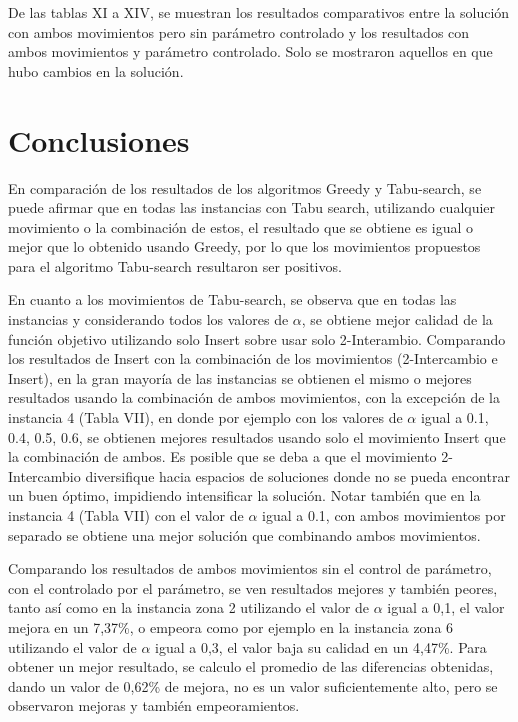 \documentclass[conference]{IEEEtran}
\begin{document}
De las tablas XI a XIV, se muestran los resultados comparativos entre la soluci\'on con ambos movimientos pero sin par\'ametro controlado y los resultados con ambos movimientos y par\'ametro controlado. Solo se mostraron aquellos en que hubo cambios en la soluci\'on.


\section{Conclusiones}

En comparaci\'on de los resultados de los algoritmos Greedy y Tabu-search, se puede afirmar que en todas las instancias con Tabu search, utilizando cualquier movimiento o la combinaci\'on de estos, el resultado que se obtiene es igual o mejor que lo obtenido usando Greedy, por lo que los movimientos propuestos para el algoritmo Tabu-search resultaron ser positivos.

En cuanto a los movimientos de Tabu-search, se observa que en todas las instancias y considerando todos los valores de $\alpha$, se obtiene mejor calidad de la funci\'on objetivo utilizando solo Insert sobre usar solo 2-Interambio. Comparando los resultados de Insert con la combinaci\'on de los movimientos (2-Intercambio e Insert), en la gran mayor\'ia de las instancias se obtienen el mismo o mejores resultados usando la combinaci\'on de ambos movimientos, con la excepci\'on de la instancia 4 (Tabla VII), en donde por ejemplo con los valores de $\alpha$ igual a 0.1, 0.4, 0.5, 0.6, se obtienen mejores resultados usando solo el movimiento Insert que la combinaci\'on de ambos. Es posible que se deba a que el movimiento 2-Intercambio diversifique hacia espacios de soluciones donde no se pueda encontrar un buen \'optimo, impidiendo intensificar la soluci\'on. Notar tambi\'en que en la instancia 4 (Tabla VII) con el valor de $\alpha$ igual a 0.1, con ambos movimientos por separado se obtiene una mejor soluci\'on que combinando ambos movimientos.

Comparando los resultados de ambos movimientos sin el control de par\'ametro, con el controlado por el par\'ametro, se ven resultados mejores y tambi\'en peores, tanto as\'i como en la instancia zona 2 utilizando el valor de $\alpha$ igual a 0,1, el valor mejora en un 7,37\%, o empeora como por ejemplo en la instancia zona 6 utilizando el valor de $\alpha$ igual a 0,3, el valor baja su calidad en un 4,47\%. Para obtener un mejor resultado, se calculo el promedio de las diferencias obtenidas, dando un valor de 0,62\% de mejora, no es un valor suficientemente alto, pero se observaron mejoras y tambi\'en empeoramientos.
\end{document}
